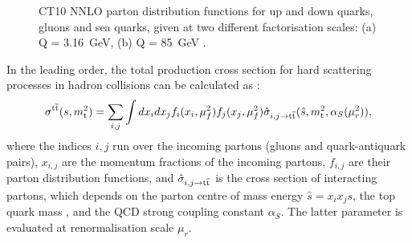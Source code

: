\begin{figure}[!hbtp]
   \centering
   \caption[CT10 NNLO parton distribution functions.]{CT10 NNLO parton distribution functions for up and down quarks,
   gluons and sea quarks, given at two different factorisation scales: (a) Q = \SI{3.16}{\GeV}, (b) Q =
   \SI{85}{\GeV} \autocite{CT10_NNLO}.}
   \label{fig:CT10_PDFs}
\end{figure}


In the leading order, the total \ttbar production cross section for hard scattering processes in hadron collisions can
be calculated as \autocite{Sterman1986, primer_LHC}:
\begin{equation}
\sigma^{\mathrm{t}\overline{\mathrm{t}}} (s,m_\mathrm{t}^2) = \sum_{i,j} \int dx_i dx_j f_i(x_i, \mu_f^2) f_j(x_j,\mu_f^2) \hat{\sigma}_{i,j
\rightarrow \mathrm{t}\overline{\mathrm{t}}} (\hat{s}, m_\mathrm{t}^2, \alpha_S(\mu_r^2)),
\end{equation}
where the indices $i,j$ run over the incoming partons (gluons and quark-antiquark pairs), $x_{i,j}$ are the momentum
fractions of the incoming partons, $f_{i,j}$ are their parton distribution functions, and $\hat{\sigma}_{i,j
\rightarrow \mathrm{t}\overline{\mathrm{t}}}$ is the cross section of interacting partons, which depends on the parton centre of mass energy
$\hat{s} = x_i x_j s$, the top quark mass \mtop, and the QCD strong coupling constant $\alpha_S$. The latter parameter
is evaluated at renormalisation scale $\mu_r$. %

